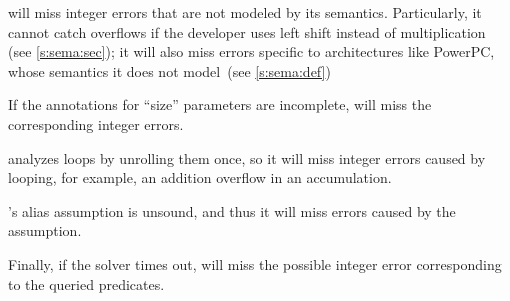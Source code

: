 \sys will miss integer errors
that are not modeled by its semantics.  Particularly, it cannot catch
overflows if the developer uses left shift instead of multiplication
(see \autoref{s:sema:sec});
it will also miss errors specific to architectures like PowerPC,
whose semantics it does not model~(see \autoref{s:sema:def})

If the annotations for ``size'' parameters are incomplete, \sys will
miss the corresponding integer errors.

\sys analyzes loops by unrolling them once, so it will miss integer
errors caused by looping, for example, an addition overflow in an
accumulation.

\sys's alias assumption is unsound, and thus it will miss errors
caused by the assumption.

Finally, if the solver times out, \sys will miss the possible integer
error corresponding to the queried predicates.
